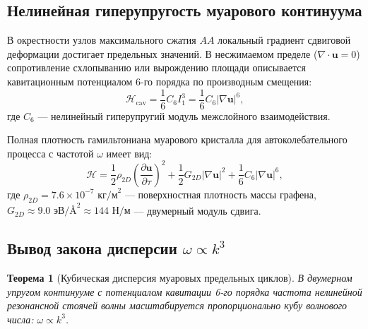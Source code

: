 \documentclass[12pt,a4paper]{article}
\newtheorem{theorem}{Теорема}
\begin{document}
	\subsection{Нелинейная гиперупругость муарового континуума}
	В окрестности узлов максимального сжатия $AA$ локальный градиент сдвиговой деформации достигает предельных значений. В несжимаемом пределе ($\nabla \cdot \mathbf{u} = 0$) сопротивление схлопыванию или вырождению площади описывается кавитационным потенциалом 6-го порядка по производным смещения:
	\begin{equation}
		\mathcal{H}_{\text{cav}} = \frac{1}{6} C_6 I_1^3 = \frac{1}{6} C_6 |\nabla \mathbf{u}|^6,
	\end{equation}
	где $C_6$ — нелинейный гиперупругий модуль межслойного взаимодействия.
	
	Полная плотность гамильтониана муарового кристалла для автоколебательного процесса с частотой $\omega$ имеет вид:
	\begin{equation}
		\mathcal{H} = \frac{1}{2} \rho_{2D} \left( \frac{\partial \mathbf{u}}{\partial \tau} \right)^2 + \frac{1}{2} G_{2D} |\nabla \mathbf{u}|^2 + \frac{1}{6} C_6 |\nabla \mathbf{u}|^6,
	\end{equation}
	где $\rho_{2D} = 7.6 \times 10^{-7}\text{ кг/м}^2$ — поверхностная плотность массы графена, $G_{2D} \approx 9.0\text{ эВ/\AA}^2 \approx 144\text{ Н/м}$ — двумерный модуль сдвига.
	
	\subsection{Вывод закона дисперсии $\omega \propto k^3$}
	\begin{theorem}[Кубическая дисперсия муаровых предельных циклов]
		В двумерном упругом континууме с потенциалом кавитации 6-го порядка частота нелинейной резонансной стоячей волны масштабируется пропорционально кубу волнового числа: $\omega \propto k^3$.
	\end{theorem}
	
\end{document}
